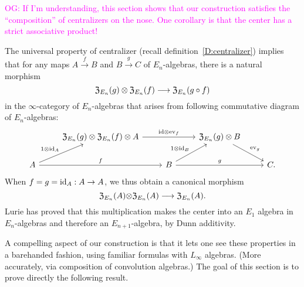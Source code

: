 \documentclass[11pt]{amsart}
\numberwithin{equation}{section}
\def\owen{\textcolor{magenta}{OG: }\textcolor{magenta}}
\begin{document}
\owen{If I'm understanding, this section shows that our construction satisfies the ``composition'' of centralizers on the nose. One corollary is that the center has a strict associative product!}

The universal property of centralizer (recall definition~\ref{D:centralizer}) implies that 
for any maps $A\stackrel{f}\to B$ and $B\stackrel{g}\to C$ of $E_n$-algebras, 
there is a natural morphism
\begin{equation}
\label{eqdef:canonicaltocentralizers} 
{\frak Z}_{E_n}(g) \otimes {\frak Z}_{E_n}(f) \longrightarrow {\frak Z}_{E_n}(g\circ f)
\end{equation}
in the $\infty$-category of $E_n$-algebras that arises from  
following commutative diagram of $E_n$-algebras:
\[
\begin{tikzcd}
&   {\frak Z}_{E_n}(g) \otimes  {\frak Z}_{E_n}(f) \otimes A \arrow[rr, "\id\otimes \ev_f"] &&  {\frak Z}_{E_n}(g) \otimes  B \arrow[dr, "\ev_g"]\\
A \arrow[ur, "1\otimes \id_A"] \arrow[rr, "f"] && B \arrow[rr, "g"] \arrow[ur, "1\otimes \id_B"] && C. 
\end{tikzcd}
\]
When $f=g={\rm id}_A:A\to A$, we thus obtain a canonical morphism 
\begin{equation} 
\label{eq:dgAssofcenter}
{\frak Z}_{E_n}(A){\otimes} {\frak Z}_{E_n}(A) \longrightarrow {\frak Z}_{E_n}(A).
\end{equation}
Lurie \cite{HA} has proved that this multiplication makes the center into an $E_1$ algebra in $E_n$-algebras 
and therefore an $E_{n+1}$-algebra, by Dunn additivity. 
%

A compelling aspect of our construction is that it lets one see these properties in a barehanded fashion,
using familiar formulas with $L_\infty$ algebras.
(More accurately, via composition of convolution algebras.)
The goal of this section is to prove directly the following result.
\end{document}
